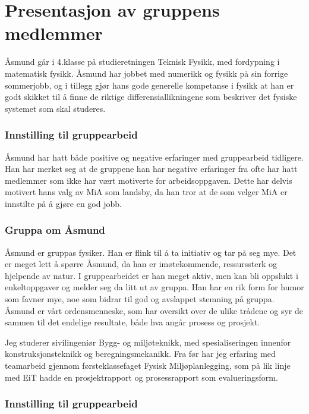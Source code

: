 \chapter{Presentasjon av gruppens medlemmer}
Åsmund går i 4.klasse på studieretningen Teknisk Fysikk, med fordypning 
i matematisk fysikk. Åsmund har jobbet med numerikk og fysikk på sin forrige 
sommerjobb, og i tillegg gjør hans gode generelle kompetanse i fysikk at han 
er godt skikket til å finne de riktige differensiallikningene som beskriver
det fysiske systemet som skal studeres.

\subsection*{Innstilling til gruppearbeid}
Åsmund har hatt både positive og negative erfaringer med gruppearbeid tidligere.
Han har merket seg at de gruppene han har negative erfaringer fra ofte har hatt
medlemmer som ikke har vært motiverte for arbeidsoppgaven. Dette har delvis
motivert hans valg av MiA som landsby, da han tror at de som velger MiA er
innstilte på å gjøre en god jobb.

\subsection*{Gruppa om Åsmund}

Åsmund er gruppas fysiker. Han er flink til å ta initiativ og tar på seg mye.
Det er meget lett å spørre Åsmund, da han er imøtekommende, ressurssterk og
hjelpende av natur. I gruppearbeidet er han meget aktiv, men kan bli oppslukt i enkeltoppgaver og
melder seg da litt ut av gruppa. Han har en rik form for humor som favner
mye, noe som bidrar til god og avslappet stemning på gruppa. Åsmund er vårt
ordensmenneske, som har oversikt over de ulike trådene og syr de sammen til det
endelige resultate, både hva angår prosess og prosjekt.

Jeg studerer sivilingeniør Bygg- og miljøteknikk, med
spesialiseringen innenfor konstruksjonsteknikk og beregningsmekanikk. Fra før
har jeg erfaring med teamarbeid gjennom førsteklassefaget Fysisk
Miljøplanlegging, som på lik linje med EiT hadde en prosjektrapport og
prosessrapport som evalueringsform.

\subsection*{Innstilling til gruppearbeid}

